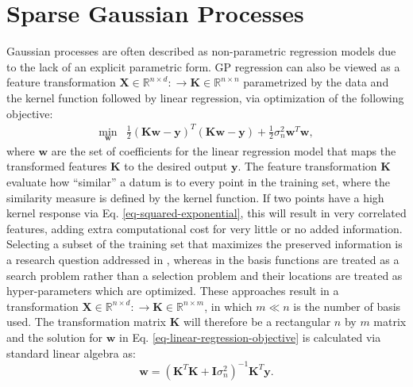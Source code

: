 \documentclass[useAMS,usenatbib,fleqn]{mn2e}
\begin{document}
\section{Sparse Gaussian Processes}
\label{sec-sparse-gaussian-processes}
Gaussian processes are often described as non-parametric regression models due to the lack of an explicit parametric form. GP regression can also be viewed as a feature transformation $\mathbf{X}\in \mathbb{R}^{n\times d}:\rightarrow \mathbf{K}\in \mathbb{R}^{n\times n}$ parametrized by the data and the kernel function followed by linear regression, via optimization of the following objective:
\begin{equation}
\label{eq-linear-regression-objective}
\begin{array}{lcl}
\underset{\mathbf{w}}{\text{min}} &\frac{1}{2}\left ( \mathbf{K}\mathbf{w}-\mathbf{y} \right )^{T}\left( \mathbf{K}\mathbf{w}-\mathbf{y} \right )+\frac{1}{2}\sigma_{n}^{2}\mathbf{w}^{T}\mathbf{w},
\end{array}
\end{equation}
where $\mathbf{w}$ are the set of coefficients for the linear regression model that maps the transformed features $\mathbf{K}$ to the desired output $\mathbf{y}$. The feature transformation $\mathbf{K}$ evaluate how ``similar'' a datum is to every point in the training set, where the similarity measure is defined by the kernel function. If two points have a high kernel response via  Eq. \eqref{eq-squared-exponential}, this will result in very correlated features, adding extra computational cost for very little or no added information. Selecting a subset of the training set that maximizes the preserved information is a research question addressed in \citet{foster2009}, whereas in \citet{snelson2005} the basis functions are treated as a search problem rather than a selection problem and their locations are treated as hyper-parameters which are optimized. These approaches result in a transformation $\mathbf{X}\in \mathbb{R}^{n\times d}:\rightarrow \mathbf{K}\in \mathbb{R}^{n\times m}$, in which $m\ll n$ is the number of basis used. The transformation matrix $\mathbf{K}$ will therefore be a rectangular $n$ by $m$ matrix and the solution for $\mathbf{w}$ in  Eq. \eqref{eq-linear-regression-objective} is calculated via standard linear algebra as:
\begin{equation}
\label{eq-linear-regression-objective-rectangular}
\mathbf{w} = \left(\mathbf{K}^{T}\mathbf{K}+\mathbf{I}\sigma_{n}^{2} \right)^{-1}\mathbf{K}^{T}\mathbf{y}.
\end{equation}
\end{document}
